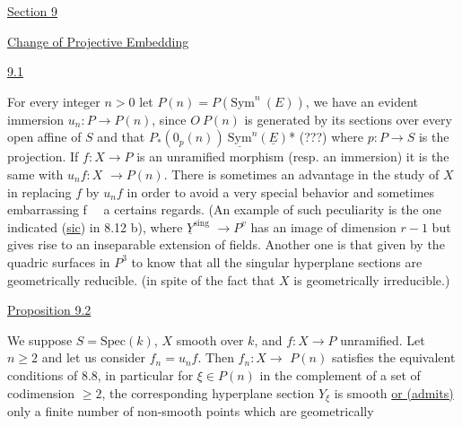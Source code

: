 
\uline{Section 9}

\uline{Change of Projective Embedding}

\uline{9.1}

For every integer $n > 0$ let $P(n) = P(\mathrm{Sym}^{n}\ (E))$, we have an
evident immersion $u_{n}\colon P \to P(n)$, since $O\ P(n)$ is generated by its
sections over every open affine of $S$ and that $P_{*}(0_{p}(n))\ \underline{\mathrm{Sym}}^{n}(\underline{E})$*
(???) where $p\colon P \to S$ is the projection.  If $f\colon X \to P$ is an
unramified morphism (resp. an immersion) it is the same with $u_{n}f\colon X$
$\to P(n)$.  There is sometimes an advantage in the study of $X$ in
replacing $f$ by $u_{n}f$ in order to avoid a very special behavior and
sometimes embarrassing f \ \ a certains regards.  (An example of
such peculiarity is the one indicated (\uline{sic}) in 8.12 b), where $\underline{Y}^{\mathrm{sing}}$
$\to P^{v}$ has an image of dimension $r - 1$ but gives rise to an
inseparable extension of fields.  Another one is that given by the
quadric surfaces in $P^{3}$ to know that all the singular hyperplane
sections are geometrically reducible.  (in spite of the fact that
$X$ is geometrically irreducible.)

\uline{Proposition 9.2}

We suppose $S = \mathrm{Spec}(k)$, $X$ smooth over $k$, and $f\colon X \to P$
unramified.  Let $n \geq 2$ and let us consider $f_{n} = u_{n}f$.  Then $f_{n}\colon X \to$
$P(n)$ satisfies the equivalent conditions of 8.8, in particular for
$\xi \in P(n)$ in the complement of a set of codimension $\geq 2$, the
corresponding hyperplane section $Y_{\xi}$ is smooth \uline{or (admits)} only a
finite number of non-smooth points which are geometrically

